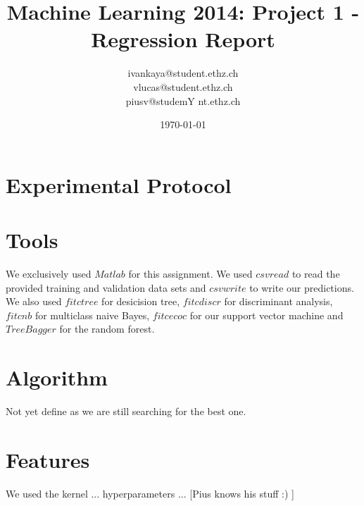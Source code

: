 \documentclass[a4paper, 11pt]{article}
\title{Machine Learning 2014: Project 1 - Regression Report}
\author{ivankaya@student.ethz.ch\\vlucas@student.ethz.ch\\ piusv@studemY nt.ethz.ch\\}
\date{\today}
\begin{document}
\maketitle

\section*{Experimental Protocol}

\section{Tools}

We exclusively used $Matlab$ for this assignment.
We used $csvread$ to read the provided training and validation data sets and
$csvwrite$ to write our predictions. We also used $fitctree$ for desicision tree, $fitcdiscr$ for discriminant analysis, $fitcnb$ for multiclass naive Bayes, $fitcecoc$ for our support vector machine and $TreeBagger$ for the random forest.


\section{Algorithm}

Not yet define as we are still searching for the best one.


\section{Features}

We used the kernel ... hyperparameters ... [Pius knows his stuff :) ]
\end{document}
